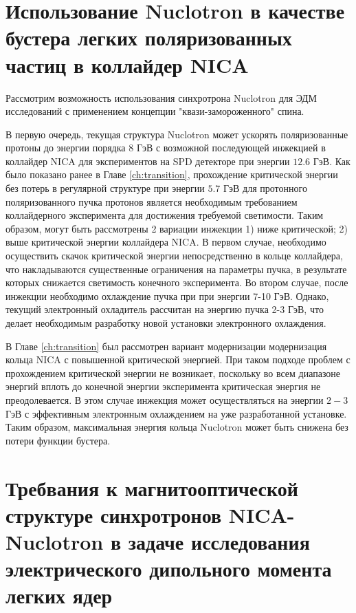 	\section{Использование Nuclotron в качестве бустера легких поляризованных частиц в коллайдер NICA}\label{sec:EDM/nuclotron}

\par Рассмотрим возможность использования синхротрона Nuclotron для ЭДМ исследований с применением концепции "квази-замороженного" спина.
\par В первую очередь, текущая структура Nuclotron может ускорять поляризованные протоны до энергии порядка $8$ ГэВ с возможной последующей инжекцией в коллайдер NICA для экспериментов на SPD детекторе при энергии $12.6$ ГэВ. Как было показано ранее в Главе \ref{ch:transition}, прохождение критической энергии без потерь в регулярной структуре при энергии $5.7$ ГэВ для протонного поляризованного пучка протонов является необходимым требованием коллайдерного эксперимента для достижения требуемой светимости. Таким образом, могут быть рассмотрены 2 вариации инжекции 1) ниже критической; 2) выше критической энергии коллайдера NICA. В первом случае, необходимо осуществить скачок критической энергии непосредственно в кольце коллайдера, что накладываются существенные ограничения на параметры пучка, в результате которых снижается светимость конечного эксперимента. Во втором случае, после инжекции необходимо охлаждение пучка при  при энергии 7-10 ГэВ. Однако, текущий электронный охладитель рассчитан на энергию пучка 2-3 ГэВ, что делает необходимым разработку новой установки электронного охлаждения.

\noindent В Главе \ref{ch:transition} был рассмотрен вариант модернизации модернизация кольца NICA с повышенной критической энергией. При таком подходе проблем с прохождением критической энергии не возникает, поскольку во всем диапазоне энергий вплоть до конечной энергии эксперимента критическая энергия не преодолевается. В этом случае инжекция может осуществляться на энергии $2-3$ ГэВ с эффективным электронным охлаждением на уже разработанной установке. Таким образом, максимальная энергия кольца Nuclotron может быть снижена без потери функции бустера.

	\section{Требвания к магнитооптической структуре синхротронов NICA-Nuclotron в задаче исследования электрического дипольного момента легких ядер}\label{sec:EDM/requirements}

